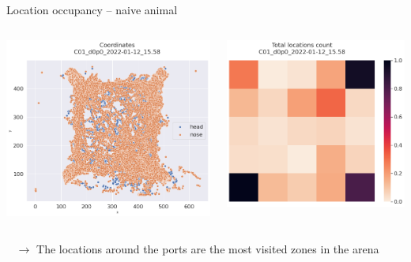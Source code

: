 \documentclass[bigger]{beamer}
\begin{document}
\begin{frame}[label={sec:org63af8d6}]{Location occupancy -- naive animal}
\begin{columns}
\begin{column}{0.5\columnwidth}
\begin{center}
\includegraphics[width=.9\linewidth]{img/C01_d0p0_2022-01-12_15.58_coordinates.png}
\end{center}
\end{column}
\begin{column}{0.5\columnwidth}
\begin{center}
\includegraphics[width=.9\linewidth]{img/C01_d0p0_2022-01-12_15.58_locations_count.png}
\end{center}
\end{column}
\end{columns}
\begin{block}{~}
\(\to\) The locations around the ports are the most visited zones in the arena
\end{block}
\end{frame}
\end{document}
